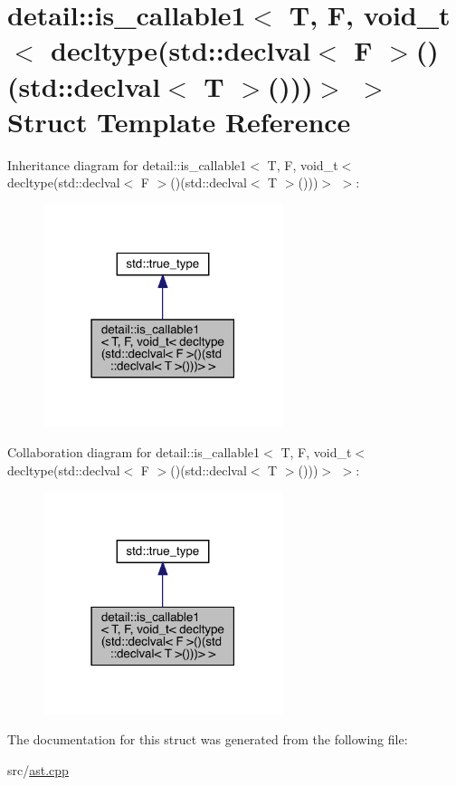 \hypertarget{structdetail_1_1is__callable1_3_01_t_00_01_f_00_01void__t_3_01decltype_07std_1_1declval_3_01_f_0031734589d10bdb36da443f727c3d6f8}{}\section{detail\+:\+:is\+\_\+callable1$<$ T, F, void\+\_\+t$<$ decltype(std\+:\+:declval$<$ F $>$()(std\+:\+:declval$<$ T $>$()))$>$ $>$ Struct Template Reference}
\label{structdetail_1_1is__callable1_3_01_t_00_01_f_00_01void__t_3_01decltype_07std_1_1declval_3_01_f_0031734589d10bdb36da443f727c3d6f8}


Inheritance diagram for detail\+:\+:is\+\_\+callable1$<$ T, F, void\+\_\+t$<$ decltype(std\+:\+:declval$<$ F $>$()(std\+:\+:declval$<$ T $>$()))$>$ $>$\+:
\nopagebreak
\begin{figure}[H]
\begin{center}
\leavevmode
\includegraphics[width=198pt]{structdetail_1_1is__callable1_3_01_t_00_01_f_00_01void__t_3_01decltype_07std_1_1declval_3_01_f_02eecf45c739747a5ac725e91ada95095}
\end{center}
\end{figure}


Collaboration diagram for detail\+:\+:is\+\_\+callable1$<$ T, F, void\+\_\+t$<$ decltype(std\+:\+:declval$<$ F $>$()(std\+:\+:declval$<$ T $>$()))$>$ $>$\+:
\nopagebreak
\begin{figure}[H]
\begin{center}
\leavevmode
\includegraphics[width=198pt]{structdetail_1_1is__callable1_3_01_t_00_01_f_00_01void__t_3_01decltype_07std_1_1declval_3_01_f_023610c0cc4f9cd7be59d7d9fd8e554b9}
\end{center}
\end{figure}


The documentation for this struct was generated from the following file\+:\begin{DoxyCompactItemize}
\item 
src/\hyperlink{ast_8cpp}{ast.\+cpp}\end{DoxyCompactItemize}
